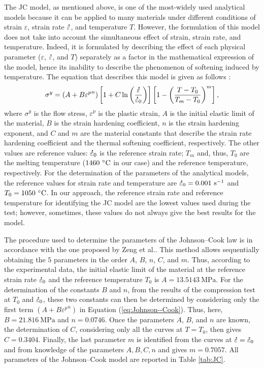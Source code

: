 \documentclass[metals,article,accept,pdftex,moreauthors]{Definitions/mdpi}
\makeatletter
\DeclareRobustCommand{\mdot}[1]{\accentset{\mbox{\bfseries .}}{#1}}
\DeclareRobustCommand{\eal}{et al.\@\xspace}
\DeclareRobustCommand{\ps}{\text{s}^{-1}}
\DeclareRobustCommand{\MPa}{\text{MPa}}
\makeatother
\begin{document}
The JC model, as mentioned above, is one of the most-widely used analytical models because it can be applied to many materials under different conditions of strain $\varepsilon$, strain rate $\mdot\varepsilon$, and temperature $T$.
However, the formulation of this model does not take into account the simultaneous effect of strain, strain rate, and temperature.
Indeed, it is formulated by describing the effect of each physical parameter ($\varepsilon$, $\mdot\varepsilon$, and $T$) separately as a factor in the mathematical expression of the model, hence its inability to describe the phenomenon of softening induced by temperature.
The equation that describes this model is given as follows \cite{Johnson-1983}:
\begin{equation}
\sigma^y=\left(A+B{\varepsilon^p}^{n}\right) \left[1+C\ln\left(\frac{\mdot\varepsilon}{\mdot\varepsilon_0}\right)\right] \left[1-\left(\frac{T-T_0}{T_m-T_0}\right)^{m}\right],\label{eq:Johnson--Cook}
\end{equation}
where $\sigma^y$ is the flow stress, $\varepsilon^p$ is the plastic strain, $A$ is the initial elastic limit of the material, $B$ is the strain hardening coefficient, $n$ is the strain hardening exponent, and $C$ and $m$ are the material constants that describe the strain rate hardening coefficient and the thermal softening coefficient, respectively.
The other values are reference values: $\mdot\varepsilon_0$ is the reference strain rate; $T_m$ and, thus, $T_0$ are the melting temperature ($1460~\celsius$ in our case) and the reference temperature, respectively.
For the determination of the parameters of the analytical models, the reference values for strain rate and temperature are $\mdot\varepsilon_0=0.001~\ps$ and $T_0=1050~\celsius$.
In our approach, the reference strain rate and reference temperature for identifying the JC model are the lowest values used during the test; however, sometimes, these values do not always give the best results for the model.

The procedure used to determine the parameters of the Johnson--Cook law is in accordance with the one proposed by Zeng \eal \cite{zeng2022constitutive}.
This method allows sequentially obtaining the $5$ parameters in the order $A$, $B$, $n$, $C$, and $m$.
Thus, according to the experimental data, the initial elastic limit of the material at the reference strain rate $\mdot\varepsilon_0$ and the reference temperature $T_0$ is $A=13.5143~\MPa$.
For the determination of the constants $B$ and $n$, from the results of the compression test at $T_0$ and $\mdot\varepsilon_0$, these two constants can then be determined by considering only the first term $\left(A+B{\varepsilon^p}^{n}\right)$ in Equation (\ref{eq:Johnson--Cook}).
Thus, here, $B=21.816~\MPa$ and $n=0.0746$.
Once the parameters $A$, $B$, and $n$ are known, the determination of $C$, considering only all the curves at $T=T_0$, then gives $C=0.3404$.
Finally, the last parameter $m$ is identified from the curves at $\mdot\varepsilon=\mdot\varepsilon_0$ and from knowledge of the parameters $A, B, C, n$ and gives $m=0.7057$.
All parameters of the Johnson--Cook model are reported in Table \ref{tab:JC}.
\end{document}
